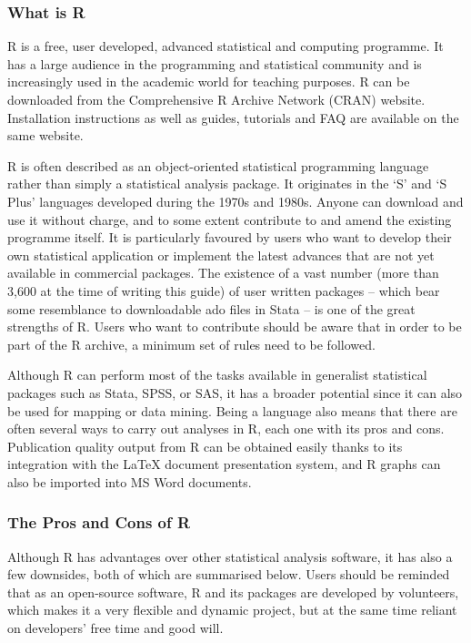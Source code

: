 \documentclass[
]{article}
\begin{document}
\hypertarget{what-is-r}{%
\subsubsection{What is R}\label{what-is-r}}

R is a free, user developed, advanced statistical and computing
programme. It has a large audience in the programming and statistical
community and is increasingly used in the academic world for teaching
purposes. R can be downloaded from the Comprehensive R Archive Network
(CRAN) website. Installation instructions as well as guides, tutorials
and FAQ are available on the same website.

R is often described as an object-oriented statistical programming
language rather than simply a statistical analysis package. It
originates in the `S' and `S Plus' languages developed during the 1970s
and 1980s. Anyone can download and use it without charge, and to some
extent contribute to and amend the existing programme itself. It is
particularly favoured by users who want to develop their own statistical
application or implement the latest advances that are not yet available
in commercial packages. The existence of a vast number (more than 3,600
at the time of writing this guide) of user written packages -- which
bear some resemblance to downloadable ado files in Stata -- is one of
the great strengths of R. Users who want to contribute should be aware
that in order to be part of the R archive, a minimum set of rules need
to be followed.

Although R can perform most of the tasks available in generalist
statistical packages such as Stata, SPSS, or SAS, it has a broader
potential since it can also be used for mapping or data mining. Being a
language also means that there are often several ways to carry out
analyses in R, each one with its pros and cons. Publication quality
output from R can be obtained easily thanks to its integration with the
LaTeX document presentation system, and R graphs can also be imported
into MS Word documents.

\hypertarget{the-pros-and-cons-of-r}{%
\subsubsection{The Pros and Cons of R}\label{the-pros-and-cons-of-r}}

Although R has advantages over other statistical analysis software, it
has also a few downsides, both of which are summarised below. Users
should be reminded that as an open-source software, R and its packages
are developed by volunteers, which makes it a very flexible and dynamic
project, but at the same time reliant on developers' free time and good
will.
\end{document}
